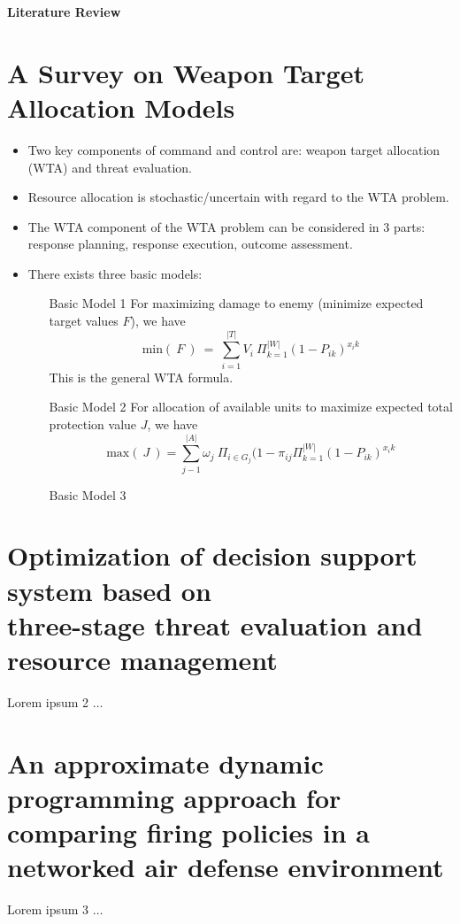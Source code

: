 \documentclass[12pt]{article} %
\begin{document}
 
\begin{center}
\textbf{Literature Review}
\end{center}
\bigskip


\section*{A Survey on Weapon Target Allocation Models \\ \cite{Ghanbari2021ASO}}
\begin{itemize}
\item Two key components of command and control are: weapon target allocation (WTA) and threat evaluation.
\item Resource allocation is stochastic/uncertain with regard to the WTA problem.
\item The WTA component of the WTA problem can be considered in 3 parts: response planning, response execution, outcome assessment.
\item There exists three basic models: 
\begin{enumerate}
    \item[Basic Model 1] For maximizing damage to enemy (minimize expected target values $F$), we have \[\text{min}(\ F\ )\ =\ \sum_{i=1}^{|T|}V_i\ \Pi_{k=1}^{|W|}(1 - P_{ik})^{x_ik}\]
    This is the general WTA formula.
    \item[Basic Model 2] For allocation of available units to maximize expected total protection value $J$, we have \[\text{max}(\ J\ ) = \sum_{j-1}^{|A|}\omega_j\ \Pi_{i \in G_j}(1 - \pi_{ij}\Pi_{k=1}^{|W|}(1 - P_{ik})^{x_ik}\]
    \item[Basic Model 3]
\end{enumerate}
\end{itemize}


\section*{Optimization of decision support system based on \\ three-stage threat evaluation and resource management \cite{Naseem2017OptimizationOD}}
Lorem ipsum 2 $\ldots$



\section*{An approximate dynamic programming approach for comparing firing policies in a networked air defense environment \cite{Summers2020AnAD}}
Lorem ipsum 3 $\ldots$
\end{document}
